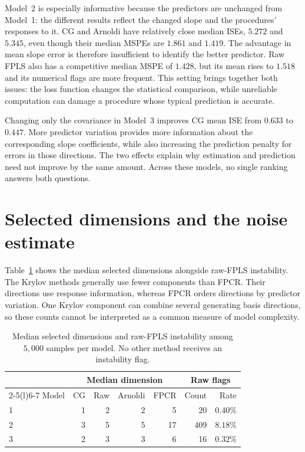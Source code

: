 Model~2 is especially informative because the predictors are unchanged
from Model~1: the different results reflect the changed slope and the
procedures' responses to it. CG and Arnoldi have relatively close median
ISEs, $5.272$ and $5.345$, even though their median MSPEs are $1.861$
and $1.419$. The advantage in mean slope error is therefore insufficient
to identify the better predictor. Raw FPLS also has a competitive median
MSPE of $1.428$, but its mean rises to $1.518$ and its numerical flags
are more frequent. This setting brings together both issues: the loss
function changes the statistical comparison, while unreliable computation
can damage a procedure whose typical prediction is accurate.

Changing only the covariance in Model~3 improves CG mean ISE from
$0.633$ to $0.447$. More predictor variation provides more information
about the corresponding slope coefficients, while also increasing the
prediction penalty for errors in those directions. The two effects
explain why estimation and prediction need not improve by the same
amount. Across these models, no single ranking answers both questions.

\section{Selected dimensions and the noise estimate}
\label{main:sec:simulation-dimensions}

Table~\ref{main:tab:simulation-dimensions} shows the median selected
dimensions alongside raw-FPLS instability. The Krylov methods generally
use fewer components than FPCR. Their directions use response information,
whereas FPCR orders directions by predictor variation. One Krylov component
can combine several generating basis directions, so these counts cannot
be interpreted as a common measure of model complexity.

\begin{table}[htbp]
    \centering
    \small
    \caption[Selected dimensions and raw-FPLS stability]{Median selected dimensions and raw-FPLS instability among
    $5{,}000$ samples per model. No other method receives an instability flag.}
    \label{main:tab:simulation-dimensions}
    \begin{tabular}{@{}lrrrrrr@{}}
        \toprule
        & \multicolumn{4}{c}{Median dimension} & \multicolumn{2}{c}{Raw flags}\\
        \cmidrule(lr){2-5}\cmidrule(l){6-7}
        Model & CG & Raw & Arnoldi & FPCR & Count & Rate\\
        \midrule
        1 & 1 & 2 & 2 & 5  & 20  & $0.40\%$\\
        2 & 3 & 5 & 5 & 17 & 409 & $8.18\%$\\
        3 & 2 & 3 & 3 & 6  & 16  & $0.32\%$\\
        \bottomrule
    \end{tabular}
\end{table}


